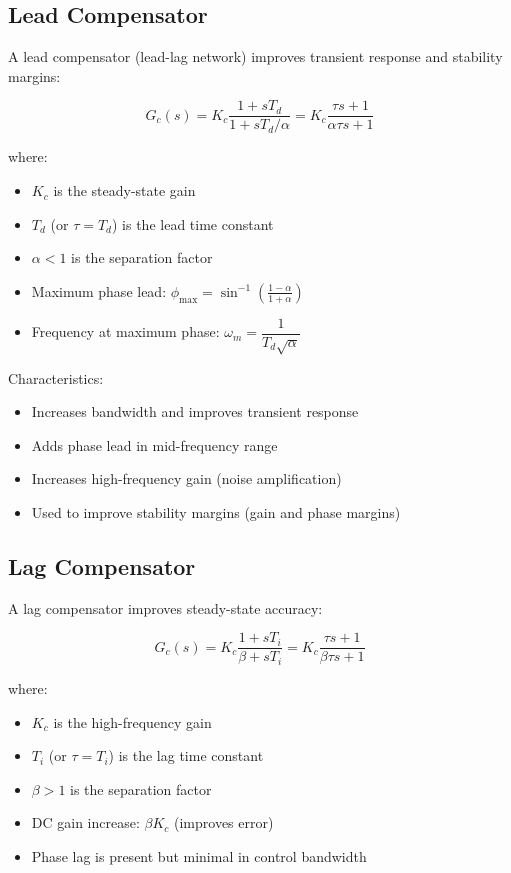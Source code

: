 \subsection{Lead Compensator}
\label{subsec:lead_compensator}

A lead compensator (lead-lag network) improves transient response and stability margins:

\begin{equation}
    G_c(s) = K_c \frac{1 + s T_d}{1 + s T_d / \alpha} = K_c \frac{\tau s + 1}{\alpha \tau s + 1}
\end{equation}

\noindent where:
\begin{itemize}
    \item $K_c$ is the steady-state gain
    \item $T_d$ (or $\tau = T_d$) is the lead time constant
    \item $\alpha < 1$ is the separation factor
    \item Maximum phase lead: $\phi_{\max} = \sin^{-1}\left(\frac{1-\alpha}{1+\alpha}\right)$
    \item Frequency at maximum phase: $\omega_m = \dfrac{1}{T_d\sqrt{\alpha}}$
\end{itemize}

Characteristics:
\begin{itemize}
    \item Increases bandwidth and improves transient response
    \item Adds phase lead in mid-frequency range
    \item Increases high-frequency gain (noise amplification)
    \item Used to improve stability margins (gain and phase margins)
\end{itemize}

\subsection{Lag Compensator}
\label{subsec:lag_compensator}

A lag compensator improves steady-state accuracy:

\begin{equation}
    G_c(s) = K_c \frac{1 + s T_i}{\beta + s T_i} = K_c \frac{\tau s + 1}{\beta \tau s + 1}
\end{equation}

\noindent where:
\begin{itemize}
    \item $K_c$ is the high-frequency gain
    \item $T_i$ (or $\tau = T_i$) is the lag time constant
    \item $\beta > 1$ is the separation factor
    \item DC gain increase: $\beta K_c$ (improves error)
    \item Phase lag is present but minimal in control bandwidth
\end{itemize}

